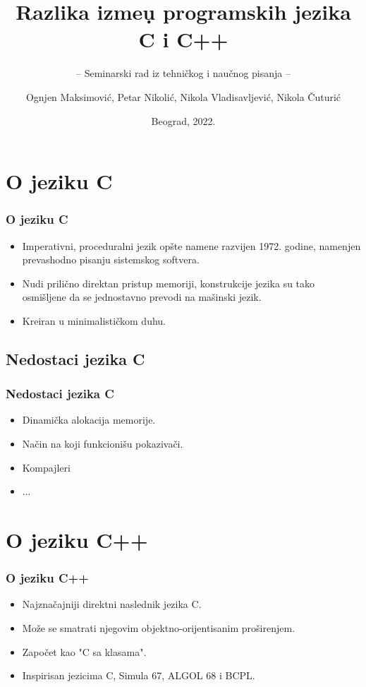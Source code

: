 \documentclass{beamer}
\title{Razlika izme\d u programskih jezika C i C++}
\subtitle{-- Seminarski rad iz tehničkog i naučnog pisanja --}
\author{Ognjen Maksimović, Petar Nikolić, Nikola Vladisavljević, Nikola Čuturić}
\institute{Matematički fakultet\\Univerzitet u Beogradu}
\date{
	\footnotesize{Beograd, 2022.}	
}
\begin{document}
\begin{frame}
	\thispagestyle{empty}
	\titlepage
\end{frame}

\addtocounter{framenumber}{-1}

\section{O jeziku C}

\begin{frame}[fragile]\frametitle{O jeziku C}
	\begin{itemize}
		\item Imperativni, proceduralni jezik opšte namene razvijen 1972. godine, namenjen prevashodno pisanju sistemskog softvera.
            \item Nudi prilično direktan pristup memoriji, konstrukcije jezika su tako osmišljene da se jednostavno prevodi na mašinski jezik.
            \item Kreiran u minimalističkom duhu.
	\end{itemize}
\end{frame}

\subsection{Nedostaci jezika C}

\begin{frame}[fragile]\frametitle{Nedostaci jezika C}
	\begin{itemize}
	    \item Dinamička alokacija memorije.
            \item Način na koji funkcionišu pokazivači.
            \item Kompajleri
            \item ...
	\end{itemize}
\end{frame}

\section{O jeziku C++}

\begin{frame}[fragile]\frametitle{O jeziku C++}
	\begin{itemize}
		\item Najznačajniji direktni naslednik jezika C.
            \item Može se smatrati njegovim objektno-orijentisanim proširenjem.
            \item Započet kao "C sa klasama".
            \item Inspirisan jezicima C, Simula 67, ALGOL 68 i BCPL.
	\end{itemize}
\end{frame}
\end{document}
